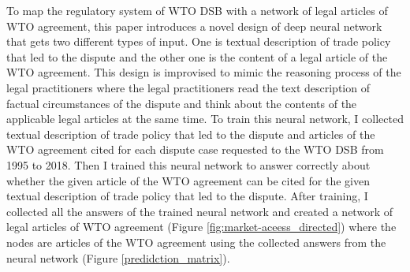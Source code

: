To map the regulatory system of WTO DSB with 
a network of legal articles of WTO agreement,
this paper introduces a novel design of deep neural network \citep{DBLP:journals/corr/Schmidhuber14} that
gets two different types of input.
One is textual description of trade policy that led to the dispute and
the other one is the content of a legal article of the WTO agreement.
This design is improvised to mimic
the reasoning process of the legal practitioners
where the legal practitioners read
the text description of
factual circumstances of the dispute and think about the contents of
the applicable legal articles at the same time.
To train this neural network, I collected textual description of trade policy 
that led to the dispute and articles of the WTO agreement cited for each dispute
case requested to the WTO DSB 
from 1995 to 2018.
Then I trained this neural network to answer correctly 
about whether the given article of the WTO agreement
can be cited for the given textual description of 
trade policy that led to the dispute.
After training, I collected all the answers of the trained neural network 
and created a network of legal articles of WTO agreement (Figure \ref{fig:market-aceess_directed}) where 
the nodes are articles of the WTO agreement using 
the collected answers from the neural network (Figure \ref{predidction_matrix}).


